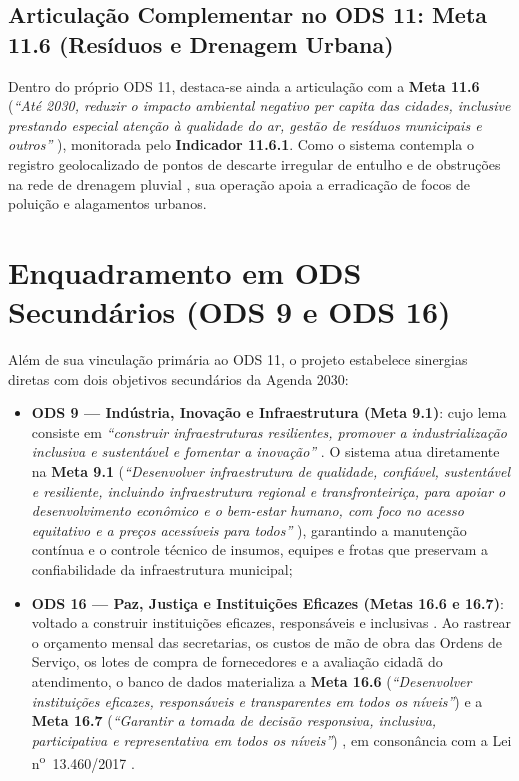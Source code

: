 \subsection{Articulação Complementar no ODS 11: Meta 11.6 (Resíduos e Drenagem Urbana)}
\label{subsec:meta-11-6}

Dentro do próprio ODS 11, destaca-se ainda a articulação com a \textbf{Meta 11.6} (\emph{``Até 2030, reduzir o impacto ambiental negativo per capita das cidades, inclusive prestando especial atenção à qualidade do ar, gestão de resíduos municipais e outros''} \cite{onubrasil2015ods11}), monitorada pelo \textbf{Indicador 11.6.1}. Como o sistema contempla o registro geolocalizado de pontos de descarte irregular de entulho e de obstruções na rede de drenagem pluvial \cite{snis2023drenagem, snis2023residuos}, sua operação apoia a erradicação de focos de poluição e alagamentos urbanos.

\section{Enquadramento em ODS Secundários (ODS 9 e ODS 16)}
\label{sec:ods-secundarios}

Além de sua vinculação primária ao ODS 11, o projeto estabelece sinergias diretas com dois objetivos secundários da Agenda 2030:

\begin{itemize}
    \item \textbf{ODS 9 --- Indústria, Inovação e Infraestrutura (Meta 9.1)}: cujo lema consiste em \emph{``construir infraestruturas resilientes, promover a industrialização inclusiva e sustentável e fomentar a inovação''} \cite{onubrasil2015ods9}. O sistema atua diretamente na \textbf{Meta 9.1} (\emph{``Desenvolver infraestrutura de qualidade, confiável, sustentável e resiliente, incluindo infraestrutura regional e transfronteiriça, para apoiar o desenvolvimento econômico e o bem-estar humano, com foco no acesso equitativo e a preços acessíveis para todos''} \cite{onubrasil2015ods9}), garantindo a manutenção contínua e o controle técnico de insumos, equipes e frotas que preservam a confiabilidade da infraestrutura municipal;
    \item \textbf{ODS 16 --- Paz, Justiça e Instituições Eficazes (Metas 16.6 e 16.7)}: voltado a construir instituições eficazes, responsáveis e inclusivas \cite{onubrasil2015ods16}. Ao rastrear o orçamento mensal das secretarias, os custos de mão de obra das Ordens de Serviço, os lotes de compra de fornecedores e a avaliação cidadã do atendimento, o banco de dados materializa a \textbf{Meta 16.6} (\emph{``Desenvolver instituições eficazes, responsáveis e transparentes em todos os níveis''}) e a \textbf{Meta 16.7} (\emph{``Garantir a tomada de decisão responsiva, inclusiva, participativa e representativa em todos os níveis''}) \cite{onubrasil2015ods16}, em consonância com a Lei n\textsuperscript{o}~13.460/2017 \cite{brasil2017lei13460}.
\end{itemize}

